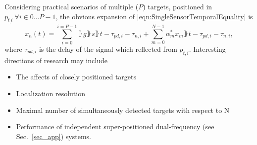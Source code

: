 Considering practical scenarios of multiple ($P$) targets, positioned in $p_{t_,i}\ \forall i\in0\dots{}P-1$, the obvious expansion of \eqref{eqn:SingleSensorTemporalEquality} is 
\begin{equation}
    \label{eqn:ftr_dyn_temp}
    x_{n}(t) = \sum_{i=0}^{i=P-1}{\rBrace{g\rBrace{s\rBrace{t-\tau_{pd,i}-\tau_{n,i}}
    +\sum_{m=0}^{N-1}{\alpha^{*}_{m}x_{m}\rBrace{t-\tau_{pd,i}-\tau_{n,i}}}}}},
\end{equation}
where $\tau_{pd,i}$ is the delay of the signal which reflected from $p_{t,i}$.
Interesting directions of research may include
\begin{itemize}
    \item The affects of closely positioned targets
    \item Localization resolution
    \item Maximal number of simultaneously detected targets with respect to N
    \item Performance of independent super-positioned dual-frequency (see Sec.~\ref{sec_app}) systems.
\end{itemize}